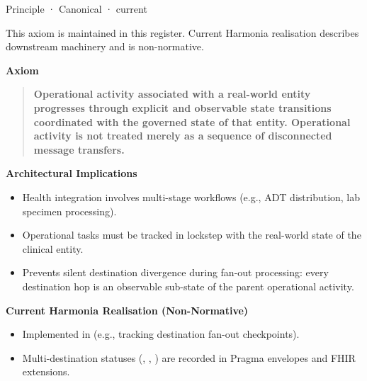 \label{element:de7e90f46127455a9ec9ad3b9b48ba54}
{\small Principle · Canonical · current}\par

This axiom is maintained in this register. Current Harmonia realisation describes downstream machinery and is non-normative.



\par\medskip\textbf{Axiom}\par


\begin{quote}


\textbf{Operational activity associated with a real-world entity progresses through explicit and observable state transitions coordinated with the governed state of that entity. Operational activity is not treated merely as a sequence of disconnected message transfers.}



\end{quote}


\par\medskip\textbf{Architectural Implications}\par


\begin{itemize}


\item Health integration involves multi-stage workflows (e.g., ADT distribution, lab specimen processing).

\item Operational tasks must be tracked in lockstep with the real-world state of the clinical entity.

\item Prevents silent destination divergence during fan-out processing: every destination hop is an observable sub-state of the parent operational activity.

\end{itemize}


\par\medskip\textbf{Current Harmonia Realisation (Non-Normative)}\par


\begin{itemize}


\item Implemented in \texttt{} (e.g., \texttt{} tracking destination fan-out checkpoints).

\item Multi-destination statuses (\texttt{}, \texttt{}, \texttt{}) are recorded in Pragma envelopes and FHIR \texttt{} extensions.

\end{itemize}


